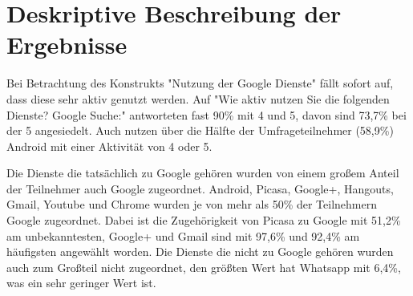 \section{Deskriptive Beschreibung der Ergebnisse}

Bei Betrachtung des Konstrukts "Nutzung der Google Dienste" fällt sofort auf, dass diese sehr aktiv genutzt werden. Auf "Wie aktiv nutzen Sie die folgenden Dienste? Google Suche:" antworteten fast 90\% mit 4 und 5, davon sind 73,7\% bei der 5 angesiedelt. Auch nutzen über die Hälfte der Umfrageteilnehmer (58,9\%) Android mit einer Aktivität von 4 oder 5.

Die Dienste die tatsächlich zu Google gehören wurden von einem großem Anteil der Teilnehmer auch Google zugeordnet. Android, Picasa, Google+, Hangouts, Gmail, Youtube und Chrome wurden je von mehr als 50\% der Teilnehmern Google zugeordnet. Dabei ist die Zugehörigkeit von Picasa zu Google mit 51,2\% am unbekanntesten, Google+ und Gmail sind mit 97,6\% und 92,4\% am häufigsten angewählt worden. Die Dienste die nicht zu Google gehören wurden auch zum Großteil nicht zugeordnet, den größten Wert hat Whatsapp mit 6,4\%, was ein sehr geringer Wert ist.

